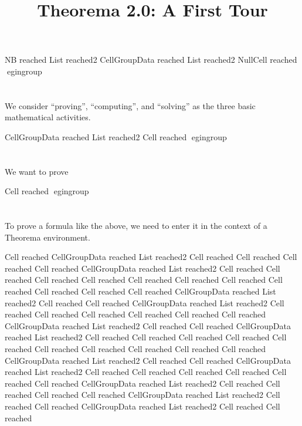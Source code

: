 \documentclass{article}
\begin{document}
% 

\title{Theorema 2.0: A First Tour}
\author{}
\date{}
\maketitle

NB reached List reached2 CellGroupData reached List reached2 NullCell reached egingroup \section*{} We consider “proving”, “computing”, and “solving” as the three basic mathematical activities.\endgroup 

CellGroupData reached List reached2 Cell reached egingroup \section*{} We want to prove\endgroup 

Cell reached egingroup \section*{} To prove a formula like the above, we need to enter it in the context of a Theorema environment.\endgroup 

Cell reached CellGroupData reached List reached2 Cell reached Cell reached Cell reached Cell reached CellGroupData reached List reached2 Cell reached Cell reached Cell reached Cell reached Cell reached Cell reached Cell reached Cell reached Cell reached Cell reached Cell reached CellGroupData reached List reached2 Cell reached Cell reached CellGroupData reached List reached2 Cell reached Cell reached Cell reached Cell reached Cell reached Cell reached CellGroupData reached List reached2 Cell reached Cell reached CellGroupData reached List reached2 Cell reached Cell reached Cell reached Cell reached Cell reached Cell reached Cell reached Cell reached Cell reached Cell reached CellGroupData reached List reached2 Cell reached Cell reached CellGroupData reached List reached2 Cell reached Cell reached Cell reached Cell reached Cell reached Cell reached CellGroupData reached List reached2 Cell reached Cell reached Cell reached Cell reached CellGroupData reached List reached2 Cell reached Cell reached CellGroupData reached List reached2 Cell reached Cell reached 
\end{document}
